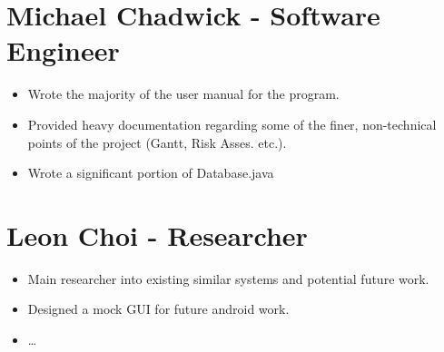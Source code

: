 \section{Michael Chadwick - Software Engineer}
\begin{itemize}
\item Wrote the majority of the user manual for the program.
\item Provided heavy documentation regarding some of the finer, non-technical
points of the project (Gantt, Risk Asses. etc.).
\item Wrote a significant portion of Database.java
\end{itemize}

\section{Leon Choi - Researcher}
\begin{itemize}
\item Main researcher into existing similar systems and potential future work.
\item Designed a mock GUI for future android work.
\item \ldots {}
\end{itemize}
